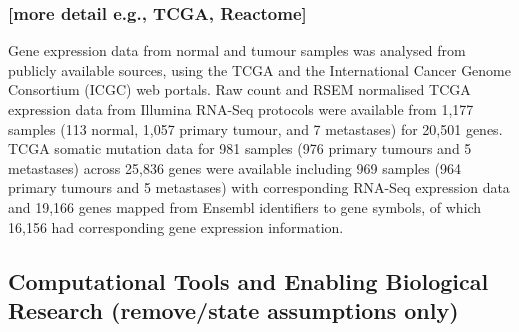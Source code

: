 \subsubsection{[more detail e.g., TCGA, Reactome]}
Gene expression data from normal and tumour samples was analysed from publicly available sources, using the TCGA \cite{TCGA2012} and the International Cancer Genome Consortium (ICGC) \cite{Zhang2011} web portals.
Raw count and RSEM normalised TCGA expression data from Illumina RNA-Seq protocols were available from 1,177 samples (113 normal, 1,057 primary tumour, and 7 metastases) for 20,501 genes. TCGA somatic mutation data for 981 samples (976 primary tumours and 5 metastases) across 25,836 genes were available including 969 samples (964 primary tumours and 5 metastases) with corresponding RNA-Seq expression data and 19,166 genes mapped from Ensembl identifiers to gene symbols, of which 16,156 had corresponding gene expression information.


\subsection{Computational Tools and Enabling Biological Research (remove/state assumptions only)}

